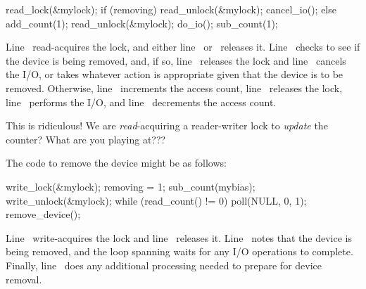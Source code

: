 \begin{linelabel}
\begin{VerbatimN}[commandchars=\\\[\]]
read_lock(&mylock);		\lnlbl[acq]
if (removing) {			\lnlbl[check]
	read_unlock(&mylock);	\lnlbl[rel1]
	cancel_io();		\lnlbl[cancel]
} else {
	add_count(1);		\lnlbl[inc]
	read_unlock(&mylock);	\lnlbl[rel2]
	do_io();		\lnlbl[do]
	sub_count(1);		\lnlbl[dec]
}
\end{VerbatimN}
\end{linelabel}

\begin{lineref}
Line~ read-acquires the lock, and either
line~ or~ releases it.
Line~ checks to see if the device is being removed, and, if so,
line~ releases the lock and
line~ cancels the I/O, or takes whatever
action is appropriate given that the device is to be removed.
Otherwise, line~ increments the access count,
line~ releases the
lock, line~ performs the I/O, and
line~ decrements the access count.
\end{lineref}

\QuickQuiz{}
	This is ridiculous!
	We are \emph{read}-acquiring a reader-writer lock to
	\emph{update} the counter?
	What are you playing at???
 \QuickQuizEnd

The code to remove the device might be as follows:

\begin{linelabel}
\begin{VerbatimN}[commandchars=\\\[\]]
write_lock(&mylock);		\lnlbl[acq]
removing = 1;			\lnlbl[note]
sub_count(mybias);
write_unlock(&mylock);		\lnlbl[rel]
while (read_count() != 0) {	\lnlbl[loop:b]
	poll(NULL, 0, 1);
}				\lnlbl[loop:e]
remove_device();		\lnlbl[remove]
\end{VerbatimN}
\end{linelabel}

\begin{lineref}
Line~ write-acquires the lock and
line~ releases it.
Line~ notes that the device is being removed, and the loop spanning
 waits for any I/O operations to complete.
Finally, line~ does any additional processing needed to prepare for
device removal.
\end{lineref}

